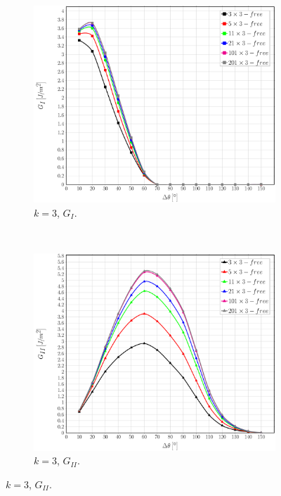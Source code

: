 \documentclass[review]{elsarticle}
\begin{document}
\begin{figure}[!h]
\centering
    \begin{subfigure}[b]{0.475\textwidth}
        \includegraphics[width=\textwidth]{sideabovefibers-t3-vf60-GI.pdf}
        \caption{$k=3$, $G_{I}$.}\label{subfig:sideabovefiber60MIt3}
    \end{subfigure} ~
    \begin{subfigure}[b]{0.475\textwidth}
        \includegraphics[width=\textwidth]{sideabovefibers-t3-vf60-GII.pdf}
        \caption{$k=3$, $G_{II}$.}\label{subfig:sideabovefiber60MIIt3}
    \end{subfigure}
    

\end{figure}
\end{document}
